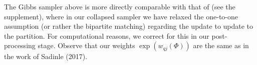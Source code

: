 \documentclass{article}
\begin{document}
\begin{enumerate}
The Gibbs sampler above is more directly comparable with that of \cite{} (see the supplement), where in our collapsed sampler we have relaxed the one-to-one assumption (or rather the bipartite matching) regarding the update to update to the partition. For computational reasons, we correct for this in our post-processing stage. Observe that our weights $\exp(w_{qj}(\Phi))$ are the same as in the work of Sadinle (2017).

\end{enumerate}
\end{document}
